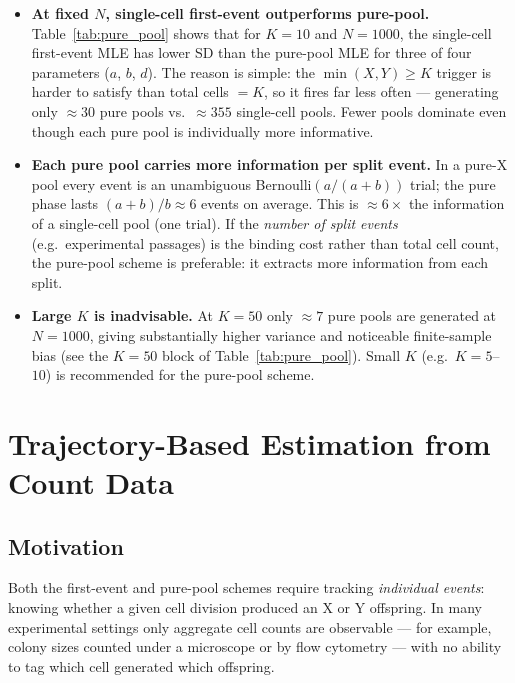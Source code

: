 \documentclass[12pt]{article}
\begin{document}
\begin{itemize}
  \item \textbf{At fixed $N$, single-cell first-event outperforms pure-pool.}
        Table~\ref{tab:pure_pool} shows that for $K = 10$ and $N = 1000$,
        the single-cell first-event MLE has lower SD than the pure-pool MLE
        for three of four parameters ($a$, $b$, $d$).  The reason is simple:
        the $\min(X,Y) \ge K$ trigger is harder to satisfy than total
        cells $= K$, so it fires far less often — generating only $\approx 30$
        pure pools vs.\ $\approx 355$ single-cell pools.  Fewer pools
        dominate even though each pure pool is individually more informative.

  \item \textbf{Each pure pool carries more information per split event.}
        In a pure-X pool every event is an unambiguous Bernoulli$(a/(a+b))$
        trial; the pure phase lasts $(a+b)/b \approx 6$ events on average.
        This is $\approx 6\times$ the information of a single-cell pool
        (one trial).  If the \emph{number of split events} (e.g.\ experimental
        passages) is the binding cost rather than total cell count, the
        pure-pool scheme is preferable: it extracts more information from
        each split.

  \item \textbf{Large $K$ is inadvisable.}
        At $K = 50$ only $\approx 7$ pure pools are generated at $N = 1000$,
        giving substantially higher variance and noticeable finite-sample
        bias (see the $K=50$ block of Table~\ref{tab:pure_pool}).
        Small $K$ (e.g.\ $K = 5$--$10$) is recommended for the pure-pool
        scheme.
\end{itemize}

\section{Trajectory-Based Estimation from Count Data}
\label{sec:trajectory}

\subsection{Motivation}

Both the first-event and pure-pool schemes require tracking \emph{individual
events}: knowing whether a given cell division produced an X or Y offspring.
In many experimental settings only aggregate cell counts are observable — for
example, colony sizes counted under a microscope or by flow cytometry — with
no ability to tag which cell generated which offspring.
\end{document}

